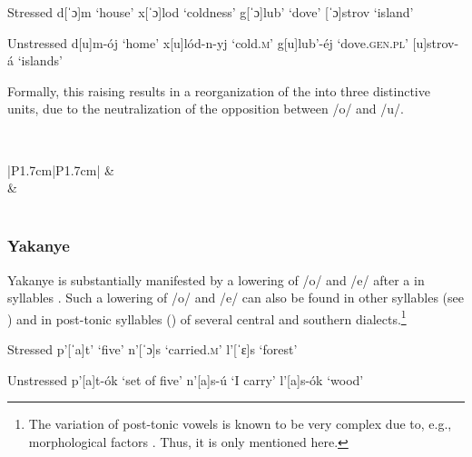\documentclass[output=paper,modfonts,newtxmath,hidelinks,]{langscibook}
\begin{document}
\ea\label{5:13}\begin{multicols}{2}
\begin{xlist}
\exi{} {Stressed}
\ex d[ˈɔ]m \tabto{2.1cm}‘house’\label{5:13a}
\exi{} x[ˈɔ]lod \tabto{2.1cm}‘coldness’
\ex g[ˈɔ]lub’ \tabto{2.1cm}‘dove’\label{5:13b}
\exi{} {[ˈɔ]strov} \tabto{2.1cm}‘island’
\end{xlist}\columnbreak
\begin{xlist}
\exi{} {Unstressed}
\exi{} d[u]m-ój \tabto{2.1cm}‘home’
\exi{} x[u]lód-n-yj \tabto{2.1cm}‘cold.\textsc{m}’
\exi{} g[u]lub’-éj \tabto{2.1cm}‘dove.\textsc{gen.pl}’
\exi{} {[u]strov-á} \tabto{2.1cm}‘islands’
\end{xlist}
\end{multicols}
\z

\noindent Formally, this raising results in a reorganization of the  into three distinctive units, due to the neutralization of the opposition between /o/ and /u/.

\label{5:14}\\\medskip
\begin{tabular}{|P{1.7cm}|P{1.7cm}|}
\hline
[ɨ]&\\\hhline{-~}
\shadecell{}&\\\hline
{}\\\hline
\end{tabular}
\z


\subsubsection{Yakanye}\label{5:s2.3.2}

Yakanye is substantially manifested by a lowering of /o/ and /e/ after a  in  syllables . Such a lowering of /o/ and /e/ can also be found in other  syllables (see \citealt[§96]{Avanesov1949}) and in post-tonic syllables (\citealt[§108--112]{Avanesov1949}) of several central and southern dialects.\footnote{The variation of post-tonic vowels is known to be very complex due to, e.g., morphological factors \citep[§107]{Avanesov1949}. Thus, it is only mentioned here.}\vspace{-\baselineskip}

\ea\label{5:15}\begin{multicols}{2}
\begin{xlist}
\exi{} {Stressed}
\exi{} p’[ˈa]t’ \tabto{2.1cm}‘five’
\exi{} n’[ˈɔ]s \tabto{2.1cm}‘carried.\textsc{m}’
\exi{} l’[ˈɛ]s \tabto{2.1cm}‘forest’
\end{xlist}\columnbreak
\begin{xlist}
\exi{} {Unstressed}
\exi{} p’[a]t-ók \tabto{2.1cm}‘set of five’
\exi{} n’[a]s-ú \tabto{2.1cm}‘I carry’
\exi{} l’[a]s-ók \tabto{2.1cm}‘wood’
\end{xlist}
\end{multicols}
\z
\end{document}
